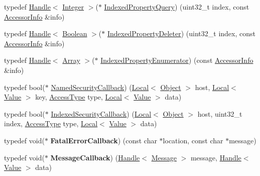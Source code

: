 \begin{DoxyCompactItemize}
\item 
typedef \hyperlink{classv8_1_1_handle}{Handle}$<$ \hyperlink{classv8_1_1_integer}{Integer} $>$($\ast$ \hyperlink{namespacev8_ac84ffd0beb05009f30378ef45a065edf}{Indexed\+Property\+Query}) (uint32\+\_\+t index, const \hyperlink{classv8_1_1_accessor_info}{Accessor\+Info} \&info)
\item 
typedef \hyperlink{classv8_1_1_handle}{Handle}$<$ \hyperlink{classv8_1_1_boolean}{Boolean} $>$($\ast$ \hyperlink{namespacev8_a3a7c18d62a0d1f2d12845051920be592}{Indexed\+Property\+Deleter}) (uint32\+\_\+t index, const \hyperlink{classv8_1_1_accessor_info}{Accessor\+Info} \&info)
\item 
typedef \hyperlink{classv8_1_1_handle}{Handle}$<$ \hyperlink{classv8_1_1_array}{Array} $>$($\ast$ \hyperlink{namespacev8_a15ab299eff53946ab483b762a4cb20dc}{Indexed\+Property\+Enumerator}) (const \hyperlink{classv8_1_1_accessor_info}{Accessor\+Info} \&info)
\item 
typedef bool($\ast$ \hyperlink{namespacev8_ab5cafda0c556bba990c660ce9c904e0d}{Named\+Security\+Callback}) (\hyperlink{classv8_1_1_local}{Local}$<$ \hyperlink{classv8_1_1_object}{Object} $>$ host, \hyperlink{classv8_1_1_local}{Local}$<$ \hyperlink{classv8_1_1_value}{Value} $>$ key, \hyperlink{namespacev8_add8bef6469c5b94706584124e610046c}{Access\+Type} type, \hyperlink{classv8_1_1_local}{Local}$<$ \hyperlink{classv8_1_1_value}{Value} $>$ data)
\item 
typedef bool($\ast$ \hyperlink{namespacev8_aebbcc7837753e51112d944ad96520da1}{Indexed\+Security\+Callback}) (\hyperlink{classv8_1_1_local}{Local}$<$ \hyperlink{classv8_1_1_object}{Object} $>$ host, uint32\+\_\+t index, \hyperlink{namespacev8_add8bef6469c5b94706584124e610046c}{Access\+Type} type, \hyperlink{classv8_1_1_local}{Local}$<$ \hyperlink{classv8_1_1_value}{Value} $>$ data)
\item 
\hypertarget{namespacev8_abc93f69508701f18dc5cc0ce165616aa}{}typedef void($\ast$ {\bfseries Fatal\+Error\+Callback}) (const char $\ast$location, const char $\ast$message)\label{namespacev8_abc93f69508701f18dc5cc0ce165616aa}

\item 
\hypertarget{namespacev8_a38b70e3fac4b122af376012f1916b6de}{}typedef void($\ast$ {\bfseries Message\+Callback}) (\hyperlink{classv8_1_1_handle}{Handle}$<$ \hyperlink{classv8_1_1_message}{Message} $>$ message, \hyperlink{classv8_1_1_handle}{Handle}$<$ \hyperlink{classv8_1_1_value}{Value} $>$ data)\label{namespacev8_a38b70e3fac4b122af376012f1916b6de}


\end{DoxyCompactItemize}
